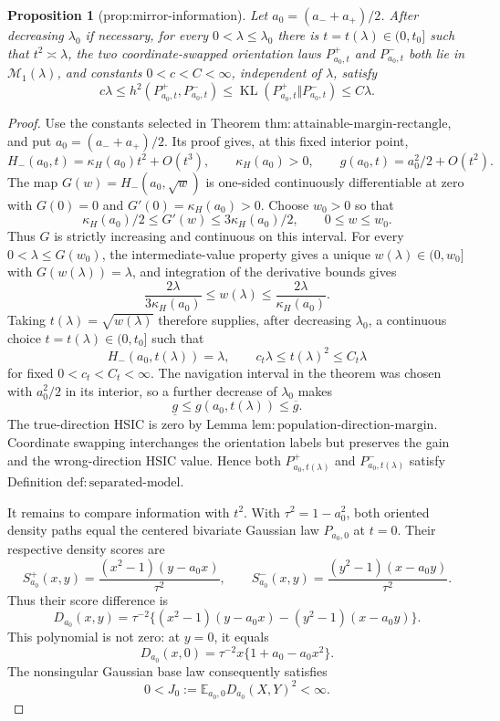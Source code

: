 \documentclass{article}
\newtheorem{proposition}{Proposition}
\begin{document}
\begin{proposition}[prop:mirror-information]\label{prop:mirror-information}
Let \(a_0=(a_-+a_+)/2\).  After decreasing \(\lambda_0\) if necessary, for every \(0<\lambda\le\lambda_0\) there is \(t=t(\lambda)\in(0,t_0]\) such that \(t^2\asymp\lambda\), the two coordinate-swapped orientation laws \(P^+_{a_0,t}\) and \(P^-_{a_0,t}\) both lie in \(\mathcal M_1(\lambda)\), and constants \(0<c<C<\infty\), independent of \(\lambda\), satisfy
\[
c\lambda\le h^2(P^+_{a_0,t},P^-_{a_0,t})\le
\operatorname{KL}(P^+_{a_0,t}\Vert P^-_{a_0,t})\le C\lambda.
\]
\end{proposition}
\begin{proof}
Use the constants selected in Theorem \(\mathrm{thm:attainable\text{-}margin\text{-}rectangle}\), and put \(a_0=(a_-+a_+)/2\).  Its proof gives, at this fixed interior point,
\[
H_-(a_0,t)=\kappa_H(a_0)t^2+O(t^3),\qquad \kappa_H(a_0)>0,\qquad
g(a_0,t)=a_0^2/2+O(t^2).
\]
The map \(G(w)=H_-(a_0,\sqrt w)\) is one-sided continuously differentiable at zero with \(G(0)=0\) and \(G'(0)=\kappa_H(a_0)>0\).  Choose \(w_0>0\) so that
\[
\kappa_H(a_0)/2\le G'(w)\le3\kappa_H(a_0)/2,\qquad 0\le w\le w_0.
\]
Thus \(G\) is strictly increasing and continuous on this interval.  For every \(0<\lambda\le G(w_0)\), the intermediate-value property gives a unique \(w(\lambda)\in(0,w_0]\) with \(G(w(\lambda))=\lambda\), and integration of the derivative bounds gives
\[
\frac{2\lambda}{3\kappa_H(a_0)}\le w(\lambda)\le
\frac{2\lambda}{\kappa_H(a_0)}.
\]
Taking \(t(\lambda)=\sqrt{w(\lambda)}\) therefore supplies, after decreasing \(\lambda_0\), a continuous choice \(t=t(\lambda)\in(0,t_0]\) such that
\[
H_-(a_0,t(\lambda))=\lambda,\qquad
c_t\lambda\le t(\lambda)^2\le C_t\lambda
\]
for fixed \(0<c_t<C_t<\infty\).  The navigation interval in the theorem was chosen with \(a_0^2/2\) in its interior, so a further decrease of \(\lambda_0\) makes
\[
\underline g\le g(a_0,t(\lambda))\le\overline g.
\]
The true-direction HSIC is zero by Lemma \(\mathrm{lem:population\text{-}direction\text{-}margin}\).  Coordinate swapping interchanges the orientation labels but preserves the gain and the wrong-direction HSIC value.  Hence both \(P^+_{a_0,t(\lambda)}\) and \(P^-_{a_0,t(\lambda)}\) satisfy Definition \(\mathrm{def:separated\text{-}model}\).

It remains to compare information with \(t^2\).  With \(\tau^2=1-a_0^2\), both oriented density paths equal the centered bivariate Gaussian law \(P_{a_0,0}\) at \(t=0\).  Their respective density scores are
\[
S^+_{a_0}(x,y)=\frac{(x^2-1)(y-a_0x)}{\tau^2},\qquad
S^-_{a_0}(x,y)=\frac{(y^2-1)(x-a_0y)}{\tau^2}.
\]
Thus their score difference is
\[
D_{a_0}(x,y)=\tau^{-2}\{(x^2-1)(y-a_0x)-(y^2-1)(x-a_0y)\}.
\]
This polynomial is not zero: at \(y=0\), it equals
\[
D_{a_0}(x,0)=\tau^{-2}x\{1+a_0-a_0x^2\}.
\]
The nonsingular Gaussian base law consequently satisfies
\[
0<J_0:=\mathbb E_{a_0,0}D_{a_0}(X,Y)^2<\infty.
\]


\end{proof}
\end{document}
